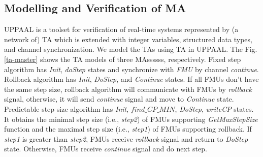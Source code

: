 \subsection{Modelling and Verification of MA} 
UPPAAL is a toolset for verification of real-time systems represented by (a network of) TA which is extended with integer variables, structured data types, and channel synchronization. We model the TAs using TA in UPPAAL. The Fig.\ref{ta-master} shows the TA models of three MAssssss,  respectively. Fixed step algorithm has \emph{Init}, \emph{doStep} states and synchronize with \emph{FMU} by channel \emph{continue}. Rollback algorithm has \emph{Init}, \emph{DoStep}, and \emph{Continue} states. If all FMUs don't have the same step size, rollback algorithm will communicate with FMUs by \emph{rollback} signal, otherwise, it will send \emph{continue} signal and move to \emph{Continue} state. Predictable step size algorithm has \emph{Init}, $find \_ CP \_ MIN$, \emph{DoStep}, \emph{writeCP} states. It obtains the minimal step size (i.e., \emph{step2}) of FMUs supporting \emph{GetMaxStepSize} function and the maximal step size (i.e., \emph{step1}) of FMUs supporting rollback. If \emph{step1} is greater than \emph{step2}, FMUs receive \emph{rollback} signal and return to \emph{DoStep} state. Otherwise, FMUs receive \emph{continue} signal and do next step.  

\begin{figure}[htbp]
\end{figure}

